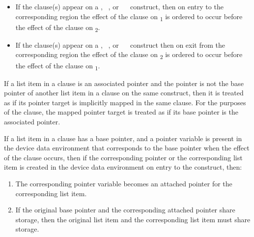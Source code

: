 \begin{itemize}
\item If the  clause(s) appear on a ,
      ~, or ~~ 
      construct, then on entry to the corresponding region the effect of 
      the  clause on \textsubscript{1} is ordered to 
      occur before the effect of the  clause on 
      \textsubscript{2}.
\item If the  clause(s) appear on a ,
      ~, or ~~ 
      construct then on exit from the corresponding region the effect of 
      the  clause on \textsubscript{2} is ordered to 
      occur before the effect of the  clause on 
      \textsubscript{1}.
\end{itemize}

\begin{fortranspecific}
If a list item in a  clause is an associated pointer and the
pointer is not the base pointer of another list item in a 
clause on the same construct, then it is treated as if its pointer
target is implicitly mapped in the same clause. For the purposes of
the  clause, the mapped pointer target is treated as if its
base pointer is the associated pointer.
\end{fortranspecific}

If a list item in a  clause has a base pointer, and a pointer
variable is present in the device data environment that corresponds to the
base pointer when the effect of the  clause occurs, then if
the corresponding pointer or the corresponding
list item is created in the device data environment on entry to the
construct, then:

\begin{enumerate}



\item The corresponding pointer variable becomes an attached pointer
      for the corresponding list item.
\item If the original base pointer and the corresponding attached pointer
      share storage, then the original list item and the corresponding list item 
      must share storage. 
\end{enumerate}

